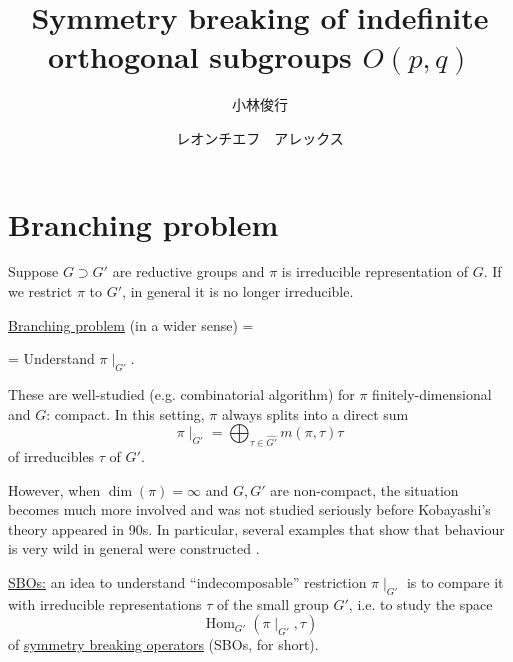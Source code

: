 \documentclass[12pt]{article} %
\newcommand{\tmop}[1]{\ensuremath{\operatorname{#1}}}
\theoremstyle{definition}
\theoremstyle{exampstyle} \newtheorem{examp}[theorem]{Theorem}
\begin{document}
\title{Symmetry breaking of indefinite orthogonal subgroups $O(p,q)$}

  \author{小林俊行}
  \author{レオンチエフ　アレックス}




  \maketitle
\section{Branching problem}

Suppose $G \supset G'$ are reductive groups and $\pi$ is irreducible
representation of $G$. If we restrict $\pi$ to $G'$, in general it is no
longer irreducible.

\begin{center}
\begin{figure}[H]
	\xymatrixrowsep{0.2pt}
	\xymatrixcolsep{0.5cm}
\vspace{-0.5cm}
\end{figure}
\end{center}


{\underline{Branching problem}} (in a wider sense) =

= Understand $\pi \mid_{G'} .$

These are well-studied (e.g. combinatorial algorithm) for $\pi$
finitely-dimensional and $G$: compact. In this setting, $\pi$ always splits
into a direct sum
\[ \pi \mid_{G'} = \bigoplus_{\tau \in \widehat{G'}} m (\pi, \tau) \tau \]
of irreducibles $\tau$ of $G'$.

However, when $\dim (\pi) = \infty$ and $G, G'$ are non-compact, the situation
becomes much more involved and was not studied seriously before Kobayashi's
theory appeared in 90s. In particular, several examples that show that
behaviour is very wild in general were constructed {\cite{Kobayashi2008}}.

{\underline{SBOs:}} an idea to understand ``indecomposable'' restriction $\pi
\mid_{G'}$ is to compare it with irreducible representations $\tau$ of the
small group $G'$, i.e. to study the space
\[ \tmop{Hom}_{G'} (\pi \mid_{G'}, \tau) \]
of {\underline{symmetry breaking operators}} (SBOs, for short).
\end{document}

